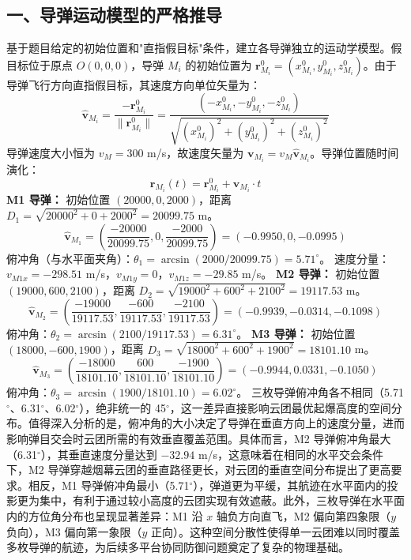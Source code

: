 \documentclass{JXUSTmodeling}
\begin{document}
\subsection{一、导弹运动模型的严格推导}
基于题目给定的初始位置和"直指假目标"条件，建立各导弹独立的运动学模型。假目标位于原点 $O(0,0,0)$，导弹 $M_i$ 的初始位置为 $\mathbf{r}_{M_i}^0=(x_{M_i}^0, y_{M_i}^0, z_{M_i}^0)$。由于导弹飞行方向直指假目标，其速度方向单位矢量为：
\begin{equation}
\hat{\mathbf{v}}_{M_i} = \frac{-\mathbf{r}_{M_i}^0}{\|\mathbf{r}_{M_i}^0\|} = \frac{(-x_{M_i}^0, -y_{M_i}^0, -z_{M_i}^0)}{\sqrt{(x_{M_i}^0)^2+(y_{M_i}^0)^2+(z_{M_i}^0)^2}} \tag{1}
\end{equation}
导弹速度大小恒为 $v_M=300$ m/s，故速度矢量为 $\mathbf{v}_{M_i}=v_M\hat{\mathbf{v}}_{M_i}$。导弹位置随时间演化：
\begin{equation}
\mathbf{r}_{M_i}(t) = \mathbf{r}_{M_i}^0 + \mathbf{v}_{M_i}\cdot t \tag{2}
\end{equation}
\textbf{M1 导弹：} 初始位置 $(20000, 0, 2000)$，距离 $D_1=\sqrt{20000^2+0+2000^2}=20099.75$ m。
\begin{equation}
\hat{\mathbf{v}}_{M_1}=\left(\frac{-20000}{20099.75}, 0, \frac{-2000}{20099.75}\right)=(-0.9950, 0, -0.0995) \tag{3}
\end{equation}
俯冲角（与水平面夹角）：$\theta_1=\arcsin(2000/20099.75)=5.71^\circ$。
速度分量：$v_{M1x}=-298.51$ m/s，$v_{M1y}=0$，$v_{M1z}=-29.85$ m/s。
\textbf{M2 导弹：} 初始位置 $(19000, 600, 2100)$，距离 $D_2=\sqrt{19000^2+600^2+2100^2}=19117.53$ m。
\begin{equation}
\hat{\mathbf{v}}_{M_2}=\left(\frac{-19000}{19117.53}, \frac{-600}{19117.53}, \frac{-2100}{19117.53}\right)=(-0.9939, -0.0314, -0.1098) \tag{4}
\end{equation}
俯冲角：$\theta_2=\arcsin(2100/19117.53)=6.31^\circ$。
\textbf{M3 导弹：} 初始位置 $(18000, -600, 1900)$，距离 $D_3=\sqrt{18000^2+600^2+1900^2}=18101.10$ m。
\begin{equation}
\hat{\mathbf{v}}_{M_3}=\left(\frac{-18000}{18101.10}, \frac{600}{18101.10}, \frac{-1900}{18101.10}\right)=(-0.9944, 0.0331, -0.1050) \tag{5}
\end{equation}
俯冲角：$\theta_3=\arcsin(1900/18101.10)=6.02^\circ$。
三枚导弹俯冲角各不相同（5.71$^\circ$、6.31$^\circ$、6.02$^\circ$），绝非统一的 45$^\circ$，这一差异直接影响云团最优起爆高度的空间分布。值得深入分析的是，俯冲角的大小决定了导弹在垂直方向上的速度分量，进而影响弹目交会时云团所需的有效垂直覆盖范围。具体而言，M2 导弹俯冲角最大（6.31$^\circ$），其垂直速度分量达到 $-32.94$ m/s，这意味着在相同的水平交会条件下，M2 导弹穿越烟幕云团的垂直路径更长，对云团的垂直空间分布提出了更高要求。相反，M1 导弹俯冲角最小（5.71$^\circ$），弹道更为平缓，其航迹在水平面内的投影更为集中，有利于通过较小高度的云团实现有效遮蔽。此外，三枚导弹在水平面内的方位角分布也呈现显著差异：M1 沿 $x$ 轴负方向直飞，M2 偏向第四象限（$y$ 负向），M3 偏向第一象限（$y$ 正向）。这种空间分散性使得单一云团难以同时覆盖多枚导弹的航迹，为后续多平台协同防御问题奠定了复杂的物理基础。
\end{document}
